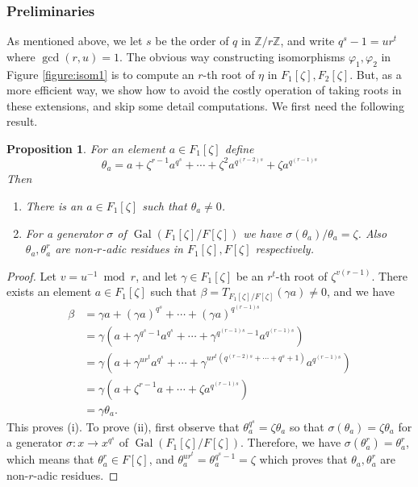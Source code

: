 \documentclass[12pt]{article}
\theoremstyle{plain}
\newtheorem{proposition}[theorem]{Proposition}
\theoremstyle{definition}
\DeclareMathOperator{\gal}{Gal} %
\begin{document}

\subsubsection{Preliminaries}

As mentioned above, we let $s$ be the order of $q$ in $\mathbb{Z} / r\mathbb{Z}$, and write $q^s - 
1 = ur^t$ where $\gcd(r, u) = 1$. The obvious way constructing isomorphisms $\varphi_1, \varphi_2$ 
in Figure \ref{figure:isom1} is to compute an $r$-th root of $\eta$ in $F_1[\zeta], F_2[\zeta]$. 
But, as a more efficient way, we show how to avoid the costly operation of taking roots in these 
extensions, and skip some detail computations. We first need the following result.
\begin{proposition}
	\label{proposition:semi-trace}
	For an element $a \in F_1[\zeta]$ define 
	\begin{equation}
	\label{equation:semi-trace} 
	\theta_a = a + \zeta^{r - 1}a^{q^s} + \cdots + \zeta^2a^{q^{(r - 2)s}} + \zeta a^{q^{(r - 1)s}}
	\end{equation}
	Then
	\begin{enumerate}
		\item[\normalfont (i)] There is an $a \in F_1[\zeta]$ such that $\theta_a \ne 0$.
		\item[\normalfont (ii)] For a generator $\sigma$ of $\gal(F_1[\zeta] / F[\zeta])$ we have 
		$\sigma(\theta_a) / \theta_a = \zeta$. Also $\theta_a, \theta_a^r$ are non-$r$-adic 
		residues in $F_1[\zeta], F[\zeta]$ respectively.
	\end{enumerate}
\end{proposition}
\begin{proof}
	Let $v = u^{-1} \bmod r$, and let $\gamma \in F_1[\zeta]$ be an $r^t$-th root of $\zeta^{v(r - 
	1)}$. There exists an element $a \in F_1[\zeta]$ such that $\beta = T_{F_1[\zeta] / 
	F[\zeta]}(\gamma a) \ne 0$, and we have 
	\begin{equation}
		\label{equation:trace}
		\begin{aligned}
		\beta 
		& = \gamma a + (\gamma a)^{q^s} + \cdots + (\gamma a)^{q^{(r - 1)s}} \\
		& = \gamma (a + \gamma^{q^s - 1}a^{q^s} + \cdots + \gamma^{q^{(r - 1)s} - 1}a^{q^{(r - 
		1)s}}) \\
		& = \gamma (a + \gamma^{ur^t}a^{q^s} + \cdots + \gamma^{ur^t(q^{(r - 2)s} + \cdots + q^s + 
		1)}a^{q^{(r - 1)s}}) \\
		& = \gamma (a + \zeta^{r - 1}a + \cdots + \zeta a^{q^{(r - 1)s}}) \\
		& = \gamma \theta_a.
		\end{aligned}
	\end{equation}
	This proves (i). To prove (ii), first observe that $\theta_a^{q^s} = \zeta\theta_a$ so that 
	$\sigma(\theta_a) = \zeta\theta_a$ for a generator $\sigma: x \to x^{q^s}$ of $\gal(F_1[\zeta] 
	/ F[\zeta])$. Therefore, we have $\sigma(\theta_a^r) = \theta_a^r$, which means that 
	$\theta_a^r \in F[\zeta]$, and $\theta_a^{ur^t} = \theta_a^{q^s - 1} = \zeta$ which proves 
	that $\theta_a, \theta_a^r$ are non-$r$-adic residues.
\end{proof}
\end{document}
